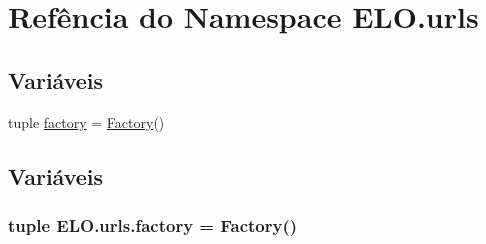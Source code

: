 \hypertarget{namespaceELO_1_1urls}{\section{Refência do Namespace E\-L\-O.\-urls}
\label{namespaceELO_1_1urls}
}
\subsection*{Variáveis}
\begin{DoxyCompactItemize}
\item 
tuple \hyperlink{namespaceELO_1_1urls_a85325dfebd736ced5558533f2c4bc29a}{factory} = \hyperlink{classELO_1_1MainUnit_1_1Factory}{Factory}()
\end{DoxyCompactItemize}


\subsection{Variáveis}
\hypertarget{namespaceELO_1_1urls_a85325dfebd736ced5558533f2c4bc29a}{
\subsubsection[{factory}]{\setlength{\rightskip}{0pt plus 5cm}tuple E\-L\-O.\-urls.\-factory = {\bf Factory}()}}\label{namespaceELO_1_1urls_a85325dfebd736ced5558533f2c4bc29a}
